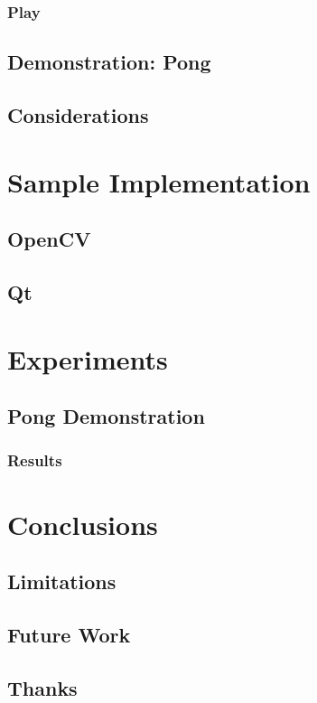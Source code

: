 \documentclass{report}
\begin{document}
\subsection{Play}

\section{Demonstration: Pong}
\section{Considerations}



\chapter{Sample Implementation}
\section{OpenCV}
\section{Qt}


\chapter{Experiments} 
\section{Pong Demonstration}
\subsection{Results}

\chapter{Conclusions}
\section{Limitations}
\section{Future Work}

\section{Thanks}



\end{document}
